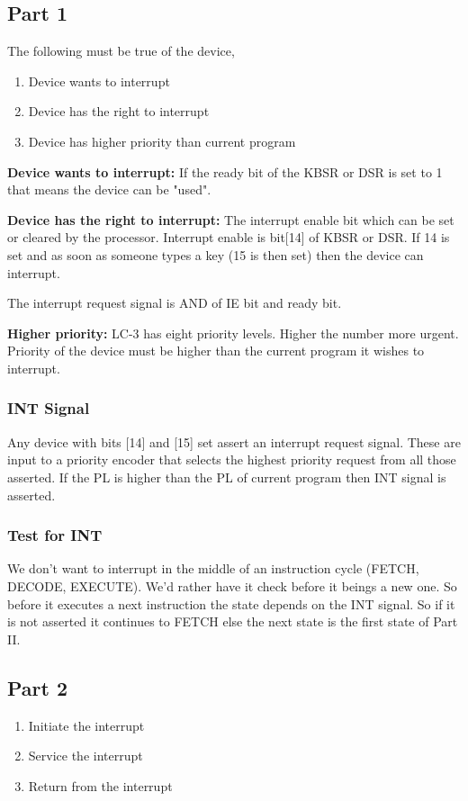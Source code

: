 \subsection{Part 1}
The following must be true of the device, 
\begin{enumerate}
    \item Device wants to interrupt
    \item Device has the right to interrupt
    \item Device has higher priority than current program
\end{enumerate}

\textbf{Device wants to interrupt:} If the ready bit of the KBSR or DSR is set to 1 that means the device can be "used".

\textbf{Device has the right to interrupt:} The interrupt enable bit which can be set or cleared by the processor. Interrupt enable is bit[14] of KBSR or DSR. If 14 is set and as soon as someone types a key (15 is then set) then the device can interrupt. 

The interrupt request signal is AND of IE bit and ready bit.


\textbf{Higher priority:} LC-3 has eight priority levels. Higher the number more urgent. Priority of the device must be higher than the current program it wishes to interrupt.


\subsubsection{INT Signal}
Any device with bits [14] and [15] set assert an interrupt request signal. These are input to a priority encoder that selects the highest priority request from all those asserted. If the PL is higher than the PL of current program then INT signal is asserted.




\subsubsection{Test for INT}
We don't want to interrupt in the middle of an instruction cycle (FETCH, DECODE, EXECUTE). We'd rather have it check before it beings a new one. So before it executes a next instruction the state depends on the INT signal. So if it is not asserted it continues to FETCH else the next state is the first state of Part II.

\subsection{Part 2}
\begin{enumerate}
    \item Initiate the interrupt 
    \item Service the interrupt 
    \item Return from the interrupt
\end{enumerate}


